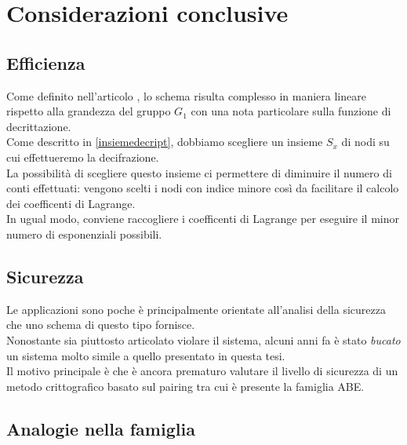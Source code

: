 \chapter{Considerazioni conclusive}



\section{Efficienza}
Come definito nell'articolo \cite[4.3]{kpabe}, lo schema risulta complesso in maniera lineare rispetto alla grandezza del gruppo $G_1$ con una nota particolare sulla funzione di decrittazione.\\
Come descritto in \ref{insiemedecript}, dobbiamo scegliere un insieme $S_x$ di nodi su cui effettueremo la decifrazione.\\
La possibilità di scegliere questo insieme ci permettere di diminuire il numero di conti effettuati: vengono scelti i nodi con indice minore così da facilitare il calcolo dei coefficenti di Lagrange.\\
In ugual modo, conviene raccogliere i coefficenti di Lagrange per eseguire il minor numero di esponenziali possibili.


\section{Sicurezza}\label{secur}

Le applicazioni sono poche è principalmente orientate all'analisi della sicurezza che uno schema di questo tipo fornisce.\\
Nonostante sia piuttosto articolato violare il sistema, alcuni anni fa \cite{nict} è stato \emph{bucato} un sistema molto simile a quello presentato in questa tesi.\\
Il motivo principale è che è ancora prematuro valutare il livello di sicurezza di un metodo crittografico basato sul pairing tra cui è presente la famiglia ABE.

\section{Analogie nella famiglia}\label{ibeabe}

